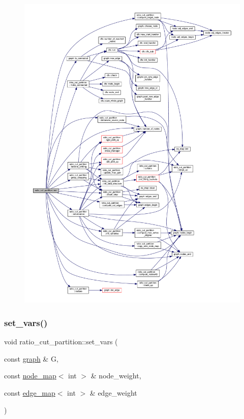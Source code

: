 \begin{figure}[H]
\begin{center}
\leavevmode
\includegraphics[width=350pt]{classratio__cut__partition_a4ab180ca4cf57c811e3478c3de4c4dc3_cgraph}
\end{center}
\end{figure}
\mbox{\label{classratio__cut__partition_a4c143f82aac5fee3b955414ab7d6ce19}} 
\subsubsection{\texorpdfstring{set\+\_\+vars()}{set\_vars()}\hspace{0.1cm}{\footnotesize\ttfamily [1/5]}}
{\footnotesize\ttfamily void ratio\+\_\+cut\+\_\+partition\+::set\+\_\+vars (\begin{DoxyParamCaption}\item[{const \mbox{\hyperlink{classgraph}{graph}} \&}]{G,  }\item[{const \mbox{\hyperlink{classnode__map}{node\+\_\+map}}$<$ int $>$ \&}]{node\+\_\+weight,  }\item[{const \mbox{\hyperlink{classedge__map}{edge\+\_\+map}}$<$ int $>$ \&}]{edge\+\_\+weight }\end{DoxyParamCaption})}

